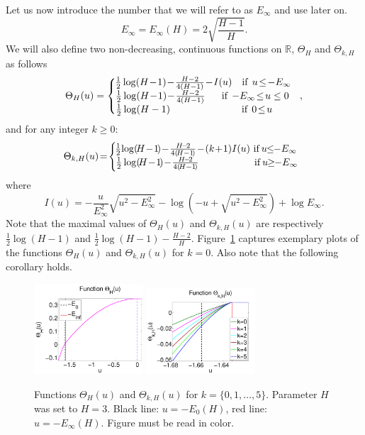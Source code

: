 \documentclass[twoside]{article}
\begin{document}
Let us now introduce the number that we will refer to as $E_{\infty}$ and use later on.
\begin{equation}
E_{\infty} = E_{\infty}(H) = 2\sqrt{\frac{H-1}{H}}.
\label{eq:E_inf}
\end{equation}
We will also define two non-decreasing, continuous functions on $\mathbb{R}$, $\Theta_H$ and $\Theta_{k,H}$ as follows
\[\Theta_H(u) = \left \{
  \begin{tabular}{c}
  $\!\!\!\!\frac{1}{2}\log(H\!-\!1) \!-\! \frac{H-2}{4(H-1)} \!-\! I(u)$ $\:\:\:$if$\:\:$$u \!\leq\! -E_{\infty}$\\
  $\!\!\!\!\!\frac{1}{2}\log(H\!-\!1) \!-\! \frac{H-2}{4(H-1)}$ $\:\:\:\:\:\:$if$\:\:$$-E_{\infty} \!\leq\! u \leq 0$\\
  $\!\!\!\!\!\!\!\!\!\!\!\!\!\!\!\frac{1}{2}\log(H-1)$ $\:\:\:\:\:\:\:\:\:\:\:\:\:\:\:\:\:\:\:\:\:\:\:\:\:\:\:\:\:\:\:$if$\:\:$$0 \!\leq\! u$
  \end{tabular}
\right.,
\]
and for any integer $k \geq 0$:
\[\Theta_{k,H}(u) \!=\! \left \{
  \begin{tabular}{c}
  $\!\!\!\!\!\frac{1}{2}\!\log(\!H\!-\!1\!) \!-\! \frac{H\!-\!2}{4(\!H-1\!)} \!-\! (k\!+\!1)I(u)$ if$\:$$u \!\!\leq\!\! -E_{\infty}$\\
  $\!\!\!\!\frac{1}{2}\log(\!H\!-\!1\!) \!-\! \frac{H\!-\!2}{4(\!H-1\!)}$ $\:\:\:\:\:\:\:\:\:\:\:\:\:\:\:\:\:\:\:\:\:\:\:\:$if$\:$$u \!\!\geq\!\! -E_{\infty}$
  \end{tabular}
\right.
\]
where 
\[I(u) = -\frac{u}{E_{\infty}^2}\sqrt{u^2 - E_{\infty}^2} - \log(-u + \sqrt{u^2 - E_{\infty}^2}) + \log E_{\infty}.
\]
Note that the maximal values of $\Theta_H(u)$ and $\Theta_{k,H}(u)$ are respectively $\frac{1}{2}\log(H-1)$ and $\frac{1}{2}\log(H-1) - \frac{H-2}{H}$. Figure~\ref{fig:Thetas} captures exemplary plots of the functions $\Theta_H(u)$ and $\Theta_{k,H}(u)$ for $k = 0$. Also note that the following corollary holds.

\begin{figure}[h]
  \center
\includegraphics[width = 1.6in]{Theta_cp.pdf}
\includegraphics[width = 1.6in]{Theta_lm_sp.pdf}
\vspace{-0.3in}
\caption{Functions $\Theta_H(u)$ and $\Theta_{k,H}(u)$ for $k = \{0,1,\dots,5\}$. Parameter $H$ was set to $H = 3$. Black line: $u = -E_0(H)$, red line: $u = -E_{\infty}(H)$. Figure must be read in color.}
\label{fig:Thetas}
\end{figure}
\end{document}
